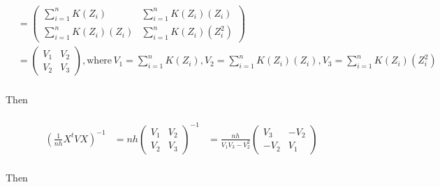 \documentclass[11pt, oneside]{article}   	%
\begin{document}
\begin{equation*}
\begin{split}
& = \left(\begin{array}{cccc}\sum_{i=1}^n K\left(Z_i\right) & \sum_{i=1}^n K\left(Z_i\right)\left(Z_i\right) \\  \sum_{i=1}^n K\left(Z_i\right)\left(Z_i\right) & \sum_{i=1}^n K\left(Z_i\right)\left(Z_i^2\right) \end{array}\right)\\
& = \left(\begin{array}{cccc} V_1 & V_2 \\  V_2 & V_3 \end{array}\right),
\text{where} \,V_1 = \sum_{i=1}^n K\left(Z_i\right), V_2 = \sum_{i=1}^n K\left(Z_i\right)\left(Z_i\right), V_3 = \sum_{i=1}^n K\left(Z_i\right)\left(Z_i^2\right)
\\
\end{split}
\end{equation*} 

Then 

\begin{equation*}
\begin{split}
\\
(\frac{1}{nh}X^t V X)^{-1} & = nh \left(\begin{array}{cccc} V_1 & V_2 \\  V_2 & V_3 \end{array}\right)^{-1} 
& = \frac{nh}{V_1V_3 - V_2^2} \left(\begin{array}{cccc} V_3 & -V_2 \\  -V_2 & V_1 \end{array}\right) 
\\
\end{split}
\end{equation*} 

Then 
\end{document}
